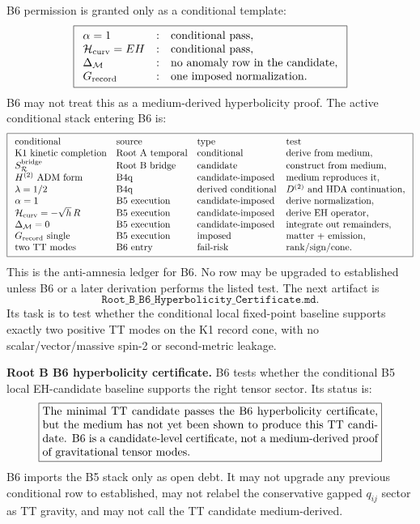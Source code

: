 \documentclass[11pt]{article}
\begin{document}
B6 permission is granted only as a conditional template:
\[
\boxed{
\begin{array}{lll}
\alpha=1 &:& \text{conditional pass},\\
{\cal H}_{\rm curv}=EH &:& \text{conditional pass},\\
\Delta_{\mathcal M} &:& \text{no anomaly row in the candidate},\\
G_{\rm record} &:& \text{one imposed normalization}.
\end{array}}
\]
B6 may not treat this as a medium-derived hyperbolicity proof.  The active
conditional stack entering B6 is:
\[
\boxed{
\begin{array}{llll}
\text{conditional} & \text{source} & \text{type} & \text{test}\\
\text{K1 kinetic completion} & \text{Root A temporal} & \text{conditional} & \text{derive from medium},\\
S_{\mathcal R}^{\rm bridge} & \text{Root B bridge} & \text{candidate} & \text{construct from medium},\\
H^{(2)}\ \text{ADM form} & \text{B4q} & \text{candidate-imposed} & \text{medium reproduces it},\\
\lambda=1/2 & \text{B4q} & \text{derived conditional} & D^{(2)}\text{ and HDA continuation},\\
\alpha=1 & \text{B5 execution} & \text{candidate-imposed} & \text{derive normalization},\\
{\cal H}_{\rm curv}=-\sqrt h\,R & \text{B5 execution} & \text{candidate-imposed} & \text{derive EH operator},\\
\Delta_{\mathcal M}=0 & \text{B5 execution} & \text{candidate-imposed} & \text{integrate out remainders},\\
G_{\rm record}\ \text{single} & \text{B5 execution} & \text{imposed} & \text{matter + emission},\\
\text{two TT modes} & \text{B6 entry} & \text{fail-risk} & \text{rank/sign/cone}.
\end{array}}
\]
This is the anti-amnesia ledger for B6.  No row may be upgraded to established
unless B6 or a later derivation performs the listed test.  The next artifact is
\[
\boxed{\texttt{Root\_B\_B6\_Hyperbolicity\_Certificate.md}.}
\]
Its task is to test whether the conditional local fixed-point baseline
supports exactly two positive TT modes on the K1 record cone, with no
scalar/vector/massive spin-2 or second-metric leakage.

\medskip\noindent\textbf{Root B B6 hyperbolicity certificate.}
B6 tests whether the conditional B5 local EH-candidate baseline supports the
right tensor sector.  Its status is:
\[
\boxed{
\begin{minipage}{0.86\linewidth}
The minimal TT candidate passes the B6 hyperbolicity certificate, but the
medium has not yet been shown to produce this TT candidate.  B6 is a
candidate-level certificate, not a medium-derived proof of gravitational
tensor modes.
\end{minipage}}
\]
B6 imports the B5 stack only as open debt.  It may not upgrade any previous
conditional row to established, may not relabel the conservative gapped
\(q_{ij}\) sector as TT gravity, and may not call the TT candidate
medium-derived.
\end{document}

